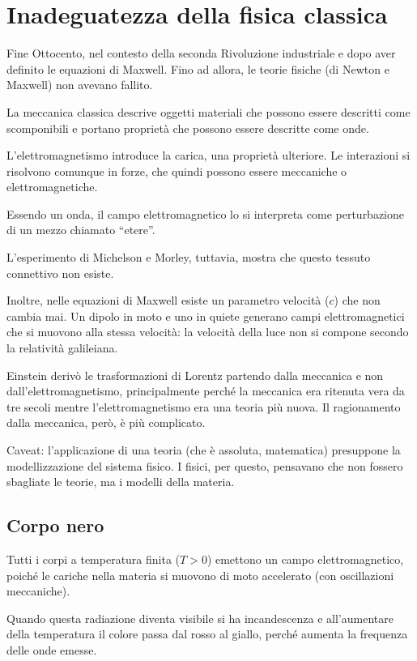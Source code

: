 \chapter{Inadeguatezza della fisica classica}

Fine Ottocento, nel contesto della seconda Rivoluzione industriale e dopo aver definito le equazioni di Maxwell.
Fino ad allora, le teorie fisiche (di Newton e Maxwell) non avevano fallito.

La meccanica classica descrive oggetti materiali che possono essere descritti come scomponibili e portano proprietà che possono essere descritte come onde.

L'elettromagnetismo introduce la carica, una proprietà ulteriore.
Le interazioni si risolvono comunque in forze, che quindi possono essere meccaniche o elettromagnetiche.

Essendo un onda, il campo elettromagnetico lo si interpreta come perturbazione di un mezzo chiamato ``etere''.

L'esperimento di Michelson e Morley, tuttavia, mostra che questo tessuto connettivo non esiste.

Inoltre, nelle equazioni di Maxwell esiste un parametro velocità ($c$) che non cambia mai.
Un dipolo in moto e uno in quiete generano campi elettromagnetici che si muovono alla stessa velocità: la velocità della luce non si compone secondo la relatività galileiana.

Einstein derivò le trasformazioni di Lorentz partendo dalla meccanica e non dall'elettromagnetismo, principalmente perché la meccanica era ritenuta vera da tre secoli mentre l'elettromagnetismo era una teoria  più nuova.
Il ragionamento dalla meccanica, però, è più complicato.

Caveat: l'applicazione di una teoria (che è assoluta, matematica) presuppone la modellizzazione del sistema fisico.
I fisici, per questo, pensavano che non fossero sbagliate le teorie, ma i modelli della materia.


\section{Corpo nero}

Tutti i corpi a temperatura finita ($T > 0$) emettono un campo elettromagnetico, poiché le cariche nella materia si muovono di moto accelerato (con oscillazioni meccaniche).

Quando questa radiazione diventa visibile si ha incandescenza e all'aumentare della temperatura il colore passa dal rosso al giallo, perché aumenta la frequenza delle onde emesse.

